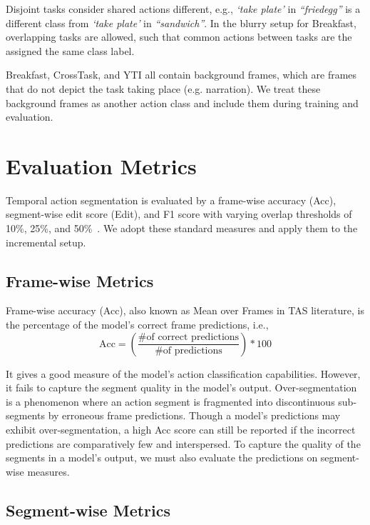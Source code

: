 Disjoint tasks consider shared actions different, e.g., \emph{`take plate'} in \emph{``friedegg''} is a different class from \emph{`take plate'} in \emph{``sandwich''}. In the blurry setup for Breakfast, overlapping tasks are allowed, such that common actions between tasks are the assigned the same class label.

Breakfast, CrossTask, and YTI all contain background frames, which are frames that do not depict the task taking place (e.g. narration). We treat these background frames as another action class and include them during training and evaluation.

\section{Evaluation Metrics}

Temporal action segmentation is evaluated by a frame-wise accuracy (Acc), segment-wise edit score (Edit), and F1 score with varying overlap thresholds of 10\%, 25\%, and 50\%~\cite{ding_temporal_2023}. We adopt these standard measures and apply them to the incremental setup.

\subsection{Frame-wise Metrics}

Frame-wise accuracy (Acc), also known as Mean over Frames in TAS literature, is the percentage of the model's correct frame predictions, i.e.,
\begin{equation}
    \text{Acc} = \left( \frac{\text{\# of correct predictions}}{\text{\# of predictions}} \right) * 100
\end{equation}

It gives a good measure of the model's action classification capabilities. However, it fails to capture the segment quality in the model's output. Over-segmentation is a phenomenon where an action segment is fragmented into discontinuous sub-segments by erroneous frame predictions. Though a model's predictions may exhibit over-segmentation, a high Acc score can still be reported if the incorrect predictions are comparatively few and interspersed. To capture the quality of the segments in a model's output, we must also evaluate the predictions on segment-wise measures.

\subsection{Segment-wise Metrics}

